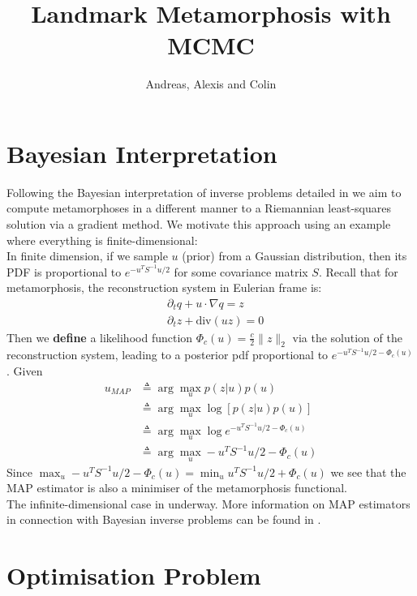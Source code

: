 \documentclass{article}
\newcommand{\norm}[2]{\| #1 \|_{ #2 }}
\newcommand{\ltwonorm}[1]{\norm{ #1 }{2}}
\begin{document}
\title{Landmark Metamorphosis with MCMC}
\author{Andreas, Alexis and Colin}
\maketitle

\section{Bayesian Interpretation}

Following the Bayesian interpretation of inverse problems detailed in
\cite{dashti2017bayesian} we aim to compute metamorphoses in a different manner
to a Riemannian least-squares solution via a gradient method. We motivate this
approach using an example where everything is finite-dimensional:\\

In finite dimension, if we sample $u$ (prior) from a Gaussian distribution,
then its PDF is proportional to $e^{-u^TS^{-1}u/2}$ for some covariance matrix
$S$. Recall that for metamorphosis, the reconstruction system in Eulerian frame
is:
\begin{align*}
& \partial_t q + u\cdot\nabla q = z\\
& \partial_t z + \text{div}(u z) = 0
\end{align*}
Then we \textbf{define} a likelihood function $\Phi_c(u)=\frac c2\ltwonorm{z}$
via the solution of the reconstruction system, leading to a posterior pdf
proportional to $e^{-u^TS^{-1}u/2 - \Phi_c(u)}$. 
Given
\begin{align*}
u_{MAP} & \triangleq \arg\max_u p(z|u)p(u)\\
        & \triangleq \arg\max_u \log [ p(z|u)p(u)]\\
        & \triangleq \arg\max_u \log e^{-u^TS^{-1}u/2 - \Phi_c(u)}\\
        & \triangleq \arg\max_u - u^TS^{-1}u/2 - \Phi_c(u)
\end{align*}
Since $\max_u - u^TS^{-1}u/2 - \Phi_c(u)= \min_u u^TS^{-1}u/2 + \Phi_c(u)$ we
see that the MAP estimator is also a minimiser of the metamorphosis
functional.\\

The infinite-dimensional case in underway. More information on MAP estimators in
connection with Bayesian inverse problems can be found in \cite{dashti2013map}.

\section{Optimisation Problem}
\end{document}
